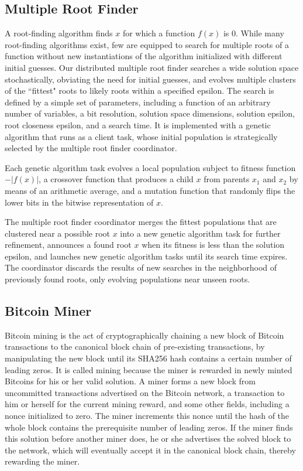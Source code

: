 \documentclass [11pt, twocolumn] {article}
\begin{document}
\subsection {Multiple Root Finder} 

\newcommand{\abs}[1]{\lvert{#1}\rvert}

A root-finding algorithm finds $x$ for which a function $f(x)$ is 0. While many root-finding algorithms exist, few are equipped to search for multiple roots of a function without new instantiations of the algorithm initialized with different initial guesses. Our distributed multiple root finder searches a wide solution space stochastically, obviating the need for initial guesses, and evolves multiple clusters of the ``fittest" roots to likely roots within a specified epsilon. The search is defined by a simple set of parameters, including a function of an arbitrary number of variables, a bit resolution, solution space dimensions, solution epsilon, root closeness epsilon, and a search time. It is implemented with a genetic algorithm that runs as a client task, whose initial population is strategically selected by the multiple root finder coordinator.

Each genetic algorithm task evolves a local population subject to fitness function $-\abs{f(x)}$, a crossover function that produces a child $x$ from parents $x_1$ and $x_2$ by means of an arithmetic average, and a mutation function that randomly flips the lower bits in the bitwise representation of $x$.

The multiple root finder coordinator merges the fittest populations that are clustered near a possible root $x$ into a new genetic algorithm task for further refinement, announces a found root $x$ when its fitness is less than the solution epsilon, and launches new genetic algorithm tasks until its search time expires. The coordinator discards the results of new searches in the neighborhood of previously found roots, only evolving populations near unseen roots.

\subsection {Bitcoin Miner}

Bitcoin mining is the act of cryptographically chaining a new block of Bitcoin transactions to the canonical block chain of pre-existing transactions, by manipulating the new block until its SHA256 hash contains a certain number of leading zeros. It is called mining because the miner is rewarded in newly minted Bitcoins for his or her valid solution. A miner forms a new block from uncommitted transactions advertised on the Bitcoin network, a transaction to him or herself for the current mining reward, and some other fields, including a nonce initialized to zero. The miner increments this nonce until the hash of the whole block contains the prerequisite number of leading zeros. If the miner finds this solution before another miner does, he or she advertises the solved block to the network, which will eventually accept it in the canonical block chain, thereby rewarding the miner.
\end{document}
